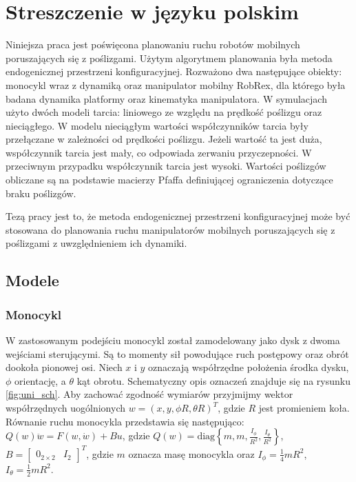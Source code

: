 \appendix
\chapter{Streszczenie w języku polskim}
\hspace{\parindent}Niniejsza praca jest poświęcona planowaniu ruchu robotów mobilnych poruszających się z poślizgami. Użytym algorytmem planowania była metoda endogenicznej przestrzeni konfiguracyjnej. Rozważono dwa następujące obiekty: monocykl wraz z dynamiką oraz manipulator mobilny RobRex, dla którego była badana dynamika platformy oraz kinematyka manipulatora. W symulacjach użyto dwóch modeli tarcia: liniowego ze względu na prędkość poślizgu oraz nieciągłego. W modelu nieciągłym wartości współczynników tarcia były przełączane w zależności od prędkości poślizgu. Jeżeli wartość ta jest duża, współczynnik tarcia jest mały, co odpowiada zerwaniu przyczepności. W przeciwnym przypadku współczynnik tarcia jest wysoki. Wartości poślizgów obliczane są na podstawie macierzy Pfaffa definiującej ograniczenia dotyczące braku poślizgów.

Tezą pracy jest to, że metoda endogenicznej przestrzeni konfiguracyjnej może być stosowana do planowania ruchu manipulatorów mobilnych poruszających się z poślizgami z uwzględnieniem ich dynamiki.
\section{Modele}
\subsection{Monocykl}
W zastosowanym podejściu monocykl został zamodelowany jako dysk z dwoma wejściami sterującymi. Są to momenty sił powodujące ruch postępowy oraz obrót dookoła pionowej osi. Niech $x$ i $y$ oznaczają współrzędne położenia środka dysku, $\phi$ orientację, a $\theta$ kąt obrotu. Schematyczny opis oznaczeń znajduje się na rysunku \ref{fig:uni_sch}. Aby zachować zgodność wymiarów przyjmijmy wektor współrzędnych uogólnionych $w = (x, y, \phi R, \theta R)^T$, gdzie $R$ jest promieniem koła. Równanie ruchu monocykla przedstawia się następująco: $Q(w)\ddot w =F(w, \dot w)+Bu$, gdzie $Q(w)=\mathrm{diag}\left\{m, m, \frac{I_\phi}{R^2}, \frac{I_\theta}{R^2}\right\}$, $B=\begin{bmatrix}
0_{2 \times 2} & I_2
\end{bmatrix}^T$, gdzie $m$ oznacza masę monocykla oraz $I_\phi=\frac{1}{4}mR^2$,
$I_\theta=\frac{1}{2}mR^2$.


